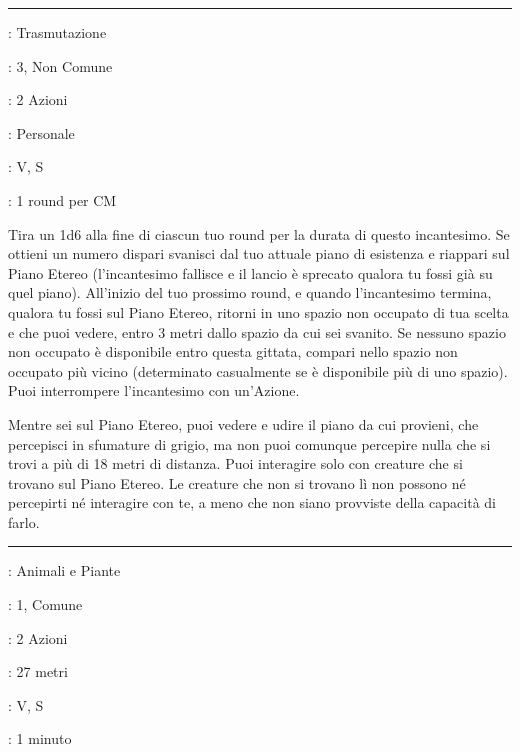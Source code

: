 \begin{multicols}{2}
\smallskip\noindent\rule{\linewidth}{2pt} \hypertarget{Intermittenza}{}\smallskip{}
\noindent
\begin{description}[noitemsep, topsep=0pt, parsep=0pt, partopsep=0pt, leftmargin=0cm, labelwidth=2.8cm]
	\item[\textbf{Lista di Magia}]: Trasmutazione
	\item[\textbf{Livello}]: 3, Non Comune
	\item[\textbf{T. di Lancio}]: 2 Azioni
	\item[\textbf{Gittata}]: Personale
	\item[\textbf{Componenti}]: V, S
	\item[\textbf{Durata}]: 1 round per CM
\end{description}

Tira un 1d6 alla fine di ciascun tuo round per la durata di questo incantesimo. Se ottieni un numero dispari svanisci dal tuo attuale piano di esistenza e riappari sul Piano Etereo (l'incantesimo fallisce e il lancio è sprecato qualora tu fossi già su quel piano). All'inizio del tuo prossimo round, e quando l'incantesimo termina, qualora tu fossi sul Piano Etereo, ritorni in uno spazio non occupato di tua scelta e che puoi vedere, entro 3 metri dallo spazio da cui sei svanito. Se nessuno spazio non occupato è disponibile entro questa gittata, compari nello spazio non occupato più vicino (determinato casualmente se è disponibile più di uno spazio). Puoi interrompere l'incantesimo con un'Azione.

Mentre sei sul Piano Etereo, puoi vedere e udire il piano da cui provieni, che percepisci in sfumature di grigio, ma non puoi comunque percepire nulla che si trovi a più di 18 metri di distanza. Puoi interagire solo con creature che si trovano sul Piano Etereo. Le creature che non si trovano lì non possono né percepirti né interagire con te, a meno che non siano provviste della capacità di farlo.

\smallskip\noindent\rule{\linewidth}{2pt} \hypertarget{Intralciare}{}\smallskip{}
\noindent
\begin{description}[noitemsep, topsep=0pt, parsep=0pt, partopsep=0pt, leftmargin=0cm, labelwidth=2.8cm]
	\item[\textbf{Lista di Magia}]: Animali e Piante
	\item[\textbf{Livello}]: 1, Comune
	\item[\textbf{T. di Lancio}]: 2 Azioni
	\item[\textbf{Gittata}]: 27 metri
	\item[\textbf{Componenti}]: V, S
	\item[\textbf{Durata}]: 1 minuto
\end{description}


\end{multicols}
